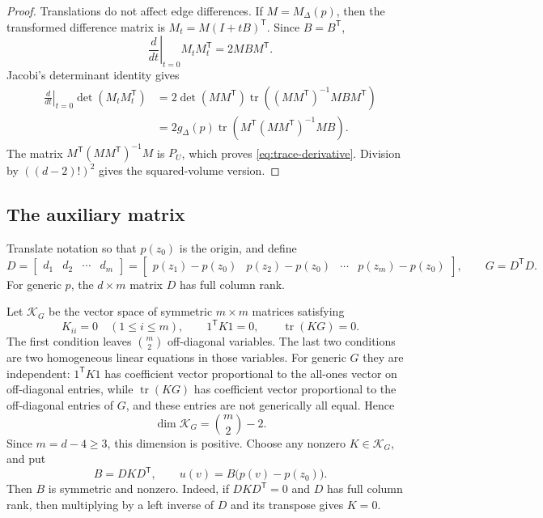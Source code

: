 \documentclass[11pt]{article}
\theoremstyle{definition}
\newcommand{\tr}{\operatorname{tr}}
\begin{document}
\begin{proof}
Translations do not affect edge differences.  If \(M=M_\Delta(p)\),
then the transformed difference matrix is
\(M_t=M(I+tB)^{\mathsf T}\).  Since \(B=B^{\mathsf T}\),
\[
  \left.\frac{d}{dt}\right|_{t=0}M_tM_t^{\mathsf T}
  =2MBM^{\mathsf T}.
\]
Jacobi's determinant identity gives
\begin{align*}
  \left.\frac{d}{dt}\right|_{t=0}\det(M_tM_t^{\mathsf T})
  &=2\det(MM^{\mathsf T})
    \tr\!\left((MM^{\mathsf T})^{-1}MBM^{\mathsf T}\right)\\
  &=2g_\Delta(p)
    \tr\!\left(M^{\mathsf T}(MM^{\mathsf T})^{-1}M B\right).
\end{align*}
The matrix \(M^{\mathsf T}(MM^{\mathsf T})^{-1}M\) is \(P_U\), which
proves \eqref{eq:trace-derivative}.  Division by \(((d-2)!)^2\) gives
the squared-volume version.
\end{proof}

\subsection{The auxiliary matrix}

Translate notation so that \(p(z_0)\) is the origin, and define
\[
  D=\begin{bmatrix}d_1&d_2&\cdots&d_m\end{bmatrix}
   =\begin{bmatrix}
      p(z_1)-p(z_0)&p(z_2)-p(z_0)&\cdots&p(z_m)-p(z_0)
    \end{bmatrix},
  \qquad G=D^{\mathsf T}D.
\]
For generic \(p\), the \(d\times m\) matrix \(D\) has full column rank.

Let \(\mathcal K_G\) be the vector space of symmetric \(m\times m\)
matrices satisfying
\begin{equation}
  K_{ii}=0\quad(1\leq i\leq m),
  \qquad
  1^{\mathsf T}K1=0,
  \qquad
  \tr(KG)=0.
  \label{eq:K-space}
\end{equation}
The first condition leaves \(\binom m2\) off-diagonal variables.  The
last two conditions are two homogeneous linear equations in those
variables.  For generic \(G\) they are independent: \(1^{\mathsf T}K1\)
has coefficient vector proportional to the all-ones vector on
off-diagonal entries, while \(\tr(KG)\) has coefficient vector
proportional to the off-diagonal entries of \(G\), and these entries
are not generically all equal.  Hence
\[
  \dim \mathcal K_G=\binom m2-2.
\]
Since \(m=d-4\geq 3\), this dimension is positive.  Choose any nonzero
\(K\in\mathcal K_G\), and put
\begin{equation}
  B=DKD^{\mathsf T},
  \qquad
  u(v)=B\bigl(p(v)-p(z_0)\bigr).
  \label{eq:flex}
\end{equation}
Then \(B\) is symmetric and nonzero.  Indeed, if \(DKD^{\mathsf T}=0\)
and \(D\) has full column rank, then multiplying by a left inverse of
\(D\) and its transpose gives \(K=0\).
\end{document}
